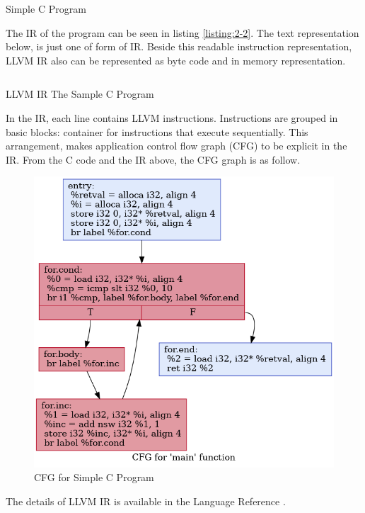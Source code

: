 \begin{listing}
\inputminted[]{c}{code/sample.c}
\caption{Simple C Program}    
\label{listing:2-1}
\end{listing}

The IR of the program can be seen in listing \ref{listing:2-2}. The text representation below, is just one of form of IR. Beside this readable instruction representation, LLVM IR also can be represented as byte code and in memory representation.

\begin{listing}
\inputminted[]{llvm}{code/sample.ll}
\caption{LLVM IR The Sample C Program}    
\label{listing:2-2}
\end{listing}

In the IR, each line contains LLVM instructions. Instructions are grouped in basic blocks: container for instructions that execute sequentially. This arrangement, makes application control flow graph (CFG) to be explicit in the IR. From the C code and the IR above, the CFG graph is as follow.

\begin{figure}[htbp]
\centerline{\includegraphics[scale=.5]{Figures/cfg.png}}
\caption{CFG for Simple C Program}
\label{fig:2-1}
\end{figure}

The details of LLVM IR is available in the Language Reference \cite{LLVMLanguageReferencea}.

